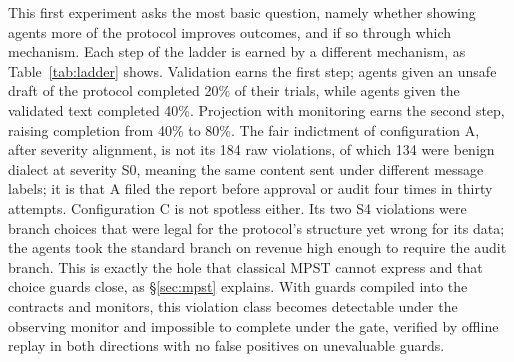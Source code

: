 \documentclass{article}
\begin{document}
This first experiment asks the most basic question, namely whether showing agents more of the protocol improves outcomes, and if so through which mechanism. Each step of the ladder is earned by a different mechanism, as Table~\ref{tab:ladder} shows. Validation earns the first step; agents given an unsafe draft of the protocol completed 20\% of their trials, while agents given the validated text completed 40\%. Projection with monitoring earns the second step, raising completion from 40\% to 80\%. The fair indictment of configuration A, after severity alignment, is not its 184 raw violations, of which 134 were benign dialect at severity S0, meaning the same content sent under different message labels; it is that A filed the report before approval or audit four times in thirty attempts. Configuration C is not spotless either. Its two S4 violations were branch choices that were legal for the protocol's structure yet wrong for its data; the agents took the standard branch on revenue high enough to require the audit branch. This is exactly the hole that classical MPST cannot express and that choice guards close, as \S\ref{sec:mpst} explains. With guards compiled into the contracts and monitors, this violation class becomes detectable under the observing monitor and impossible to complete under the gate, verified by offline replay in both directions with no false positives on unevaluable guards.
\end{document}
